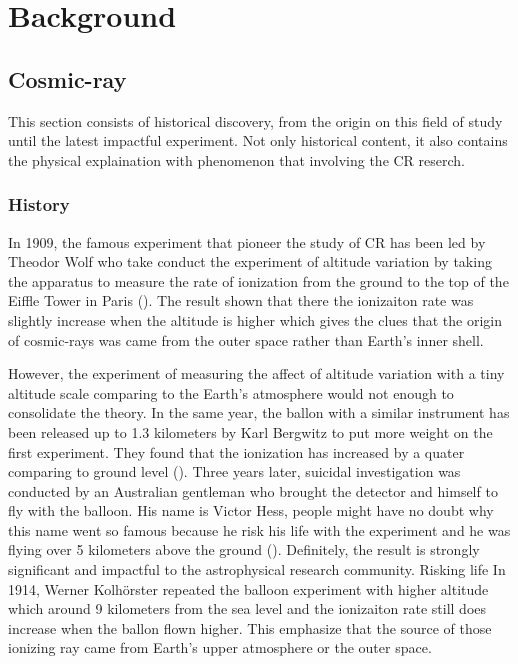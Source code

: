 \chapter{Background}


\section{Cosmic-ray}

This section consists of historical discovery, from the origin
on this field of study until the latest impactful experiment.
Not only historical content, it also contains the physical
explaination with phenomenon that involving the CR reserch.

\subsection{History}
In 1909, the famous experiment that pioneer the study of CR has been
led by Theodor Wolf who take conduct the experiment of 
altitude variation by taking the apparatus to measure 
the rate of ionization from the ground to the top of 
the Eiffle Tower in Paris (\cite{gray1949cosmic}).
The result shown that there the ionizaiton rate was slightly
increase when the altitude is higher which gives the clues
that the origin of cosmic-rays was came from the outer space
rather than Earth's inner shell.

However, the experiment of measuring the affect of altitude
variation with a tiny altitude scale comparing to the Earth's
atmosphere would not enough to consolidate the theory.
In the same year, the ballon with a similar instrument has
been released up to 1.3 kilometers by Karl Bergwitz to put 
more weight on the first experiment. They found that the 
ionization has increased by a quater comparing to ground level 
(\cite{de2014atmospheric}).
Three years later, suicidal investigation was conducted by 
an Australian gentleman who brought the detector and himself
to fly with the balloon.
His name is Victor Hess, people might have no doubt why this
name went so famous because he risk his life with the experiment 
and he was flying over 5 kilometers above the ground (\cite{hess1912beobachtungen}).
Definitely, the result is strongly significant and impactful
to the astrophysical research community. Risking life  
In 1914, Werner Kolhörster repeated the balloon experiment 
with higher altitude which around 9 kilometers from the 
sea level and the ionizaiton rate still does increase when 
the ballon flown higher. This emphasize that the source of 
those ionizing ray came from Earth's upper atmosphere
or the outer space.

